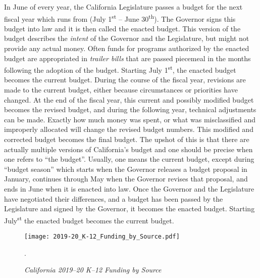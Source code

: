 In June of every year, the California Legislature passes a budget for the next fiscal year which runs from (July 1\textsuperscript{st} – June 30\textsuperscript{th}). The Governor signs this budget into law and it is then called the enacted budget. This version of the budget describes the \textit{intent} of the Governor and the Legislature, but might not provide any actual money. Often funds for programs authorized by the enacted budget are appropriated in \textit{trailer bills} that are passed piecemeal in the months following the adoption of the budget. Starting July 1\textsuperscript{st}, the enacted budget becomes the current budget. During the course of the fiscal year, revisions are made to the current budget, either because circumstances or priorities have changed. At the end of the fiscal year, this current and possibly modified budget becomes the revised budget, and during the following year, technical adjustments can be made. Exactly how much money was spent, or what was misclassified and improperly allocated will change the revised budget numbers. This modified and corrected budget becomes the final budget. The upshot of this is that there are actually multiple versions of California's budget and one should be precise when one refers to ``the budget''. Usually, one means the current budget, except during ``budget season'' which starts when the Governor releases a budget proposal in January, continues through May when the Governor revises that proposal, and ends in June when it is enacted into law. Once the Governor and the Legislature have negotiated their differences, and a budget has been passed by the Legislature and signed by the Governor, it becomes the enacted budget. Starting July\textsuperscript{st} the enacted budget becomes the current budget.

\begin{figure}
  \centering
  \caption[California 2019–20 K–12 Funding by Source]{\textit{California 2019–20 K–12 Funding by Source}}\label{fig:2019–20_K–12_Funding}
  \texttt{[image: 2019-20\_K-12\_Funding\_by\_Source.pdf]}\\ %
  \footnotesize\raggedright\textcite{LAO2021}.
\end{figure}


